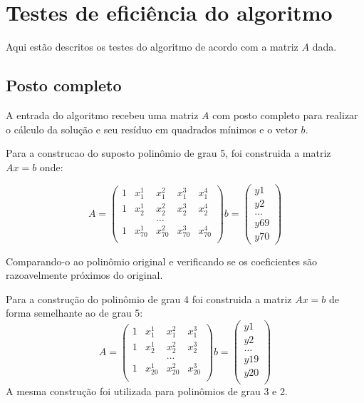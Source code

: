 \chapter{Testes de eficiência do algoritmo}
Aqui estão descritos os testes do algoritmo de acordo com a matriz $A$ dada.

\section{Posto completo}
A entrada do algoritmo recebeu uma matriz $A$ com posto completo para realizar
o cálculo da solução e seu resíduo em quadrados mínimos e o vetor $b$.

Para a construcao do suposto polinômio de grau 5, foi construida a matriz $Ax = b$
onde:

\[
A =	\left(
\begin{array}{ccccc} 
1&	x_1^1&	x_1^2&	x_1^3&	x_1^4\\
1&	x_2^1&	x_2^2&	x_2^3&	x_2^4\\
&&\ldots\\
1&	x_70^1&	x_70^2&	x_70^3&	x_70^4\\
\end{array}
\right)
b =   
\left(
\begin{array}{c}
y1\\
y2\\
\ldots\\
y69\\
y70 
\end{array}    
\right)
\]

Comparando-o ao polinômio original e verificando se os coeficientes 
são razoavelmente próximos do original.


Para a construção do polinômio de grau 4 foi construida a matriz $Ax = b$ de forma
semelhante ao de grau 5:
\[A =	
\left(
\begin{array}{cccc}
1 &	x_1^1 &	x_1^2 &	x_1^3\\
1 &	x_2^1 &	x_2^2 &	x_2^3\\
&&\dots          \\
1 &	x_20^1 &	x_20^2 &	x_20^3\\
\end{array} 
\right)
b =  
\left(
\begin{array}{c}
y1\\
y2\\
\ldots\\
y19\\
y20\\ 
\end{array}   
\right)
\]
A mesma construção foi utilizada para polinômios de grau 3 e 2.


